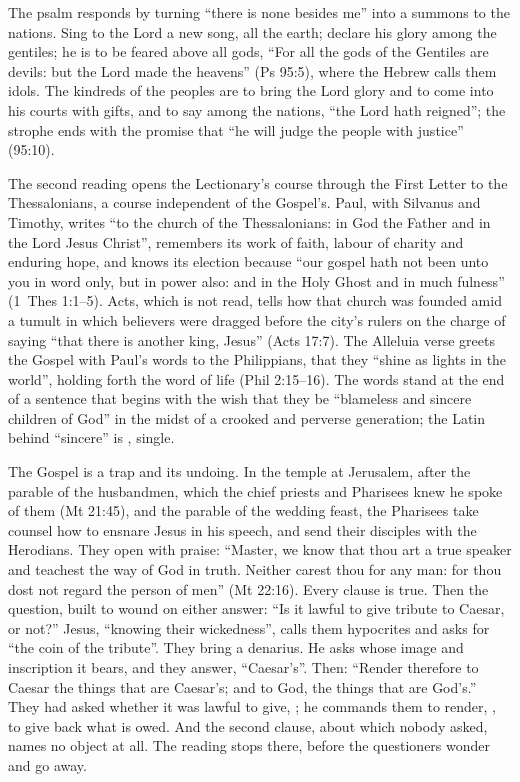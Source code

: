 The psalm responds by turning ``there is none besides me'' into a summons to
the nations. Sing to the Lord a new song, all the earth; declare his glory
among the gentiles; he is to be feared above all gods, ``For all the gods of
the Gentiles are devils: but the Lord made the heavens'' (Ps 95:5), where the
Hebrew calls them idols. The kindreds of the peoples are to bring the Lord
glory and to come into his courts with gifts, and to say among the nations,
``the Lord hath reigned''; the strophe ends with the promise that ``he will
judge the people with justice'' (95:10).

The second reading opens the Lectionary's course through the First Letter to
the Thessalonians, a course independent of the Gospel's. Paul, with Silvanus
and Timothy, writes ``to the church of the Thessalonians: in God the Father and
in the Lord Jesus Christ'', remembers its work of faith, labour of charity and
enduring hope, and knows its election because ``our gospel hath not been unto
you in word only, but in power also: and in the Holy Ghost and in much
fulness'' (1~Thes 1:1--5). Acts, which is not read, tells how that church was
founded amid a tumult in which believers were dragged before the city's rulers
on the charge of saying ``that there is another king, Jesus'' (Acts 17:7). The
Alleluia verse greets the Gospel with Paul's words to the Philippians, that
they ``shine as lights in the world'', holding forth the word of life (Phil
2:15--16). The words stand at the end of a sentence that begins with the wish
that they be ``blameless and sincere children of God'' in the midst of a
crooked and perverse generation; the Latin behind ``sincere'' is
, single.

The Gospel is a trap and its undoing. In the temple at Jerusalem, after the
parable of the husbandmen, which the chief priests and Pharisees knew he spoke
of them (Mt 21:45), and the parable of the wedding feast, the Pharisees take
counsel how to ensnare Jesus in his speech, and send their disciples with the
Herodians. They open with praise: ``Master, we know that
thou art a true speaker and teachest the way of God in truth. Neither carest
thou for any man: for thou dost not regard the person of men'' (Mt 22:16).
Every clause is true. Then the question, built to wound on either answer: ``Is
it lawful to give tribute to Caesar, or not?'' Jesus, ``knowing their
wickedness'', calls them hypocrites and asks for ``the coin of the tribute''.
They bring a denarius. He asks whose image and inscription it bears, and they
answer, ``Caesar's''. Then: ``Render therefore to Caesar the things that are
Caesar's; and to God, the things that are God's.'' They had asked whether it
was lawful to give, ; he commands them to render,
, to give back what is owed. And the second clause, about which
nobody asked, names no object at all. The reading stops there, before the
questioners wonder and go away.

